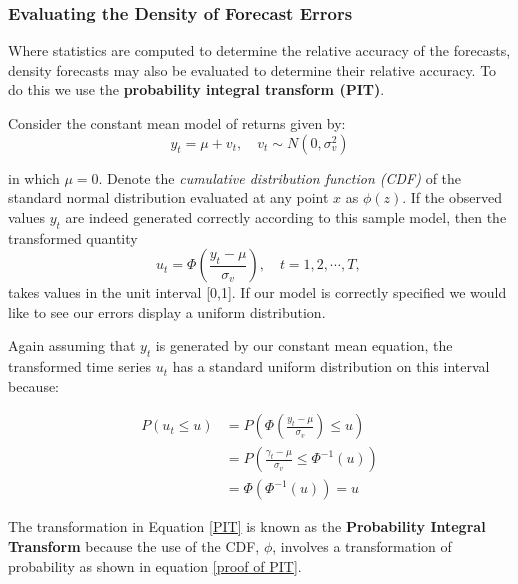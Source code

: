 \documentclass[11pt]{article}
\begin{document}
\subsubsection{Evaluating the Density of Forecast Errors}

Where statistics are computed to determine the relative accuracy of the forecasts, density forecasts may also be evaluated to determine their relative accuracy. To do this we use the \textbf{probability integral transform (PIT)}.

Consider the constant mean model of returns given by:
\begin{equation}
y_t=\mu+v_t, \quad v_t \sim N\left(0, \sigma_v^2\right)
\end{equation}

in which $\mu=0$. Denote the \textit{cumulative distribution function (CDF)} of the standard normal distribution evaluated at any point $x$ as $\phi(z)$. If the observed values $y_t$ are indeed generated correctly according to this sample model, then the transformed quantity
\begin{equation}
\label{PIT}
u_t=\Phi\left(\frac{y_t-\mu}{\sigma_v}\right), \quad t=1,2, \cdots, T \text {, }
\end{equation}
takes values in the unit interval [0,1]. If our model is correctly specified we would like to see our errors display a uniform distribution.

Again assuming that $y_t$ is generated by our constant mean equation, the transformed time series $u_t$ has a standard uniform distribution on this interval because:

\begin{equation}
\label{proof of PIT}
\begin{aligned}
P\left(u_t \leq u\right) & =P\left(\Phi\left(\frac{y_t-\mu}{\sigma_v}\right) \leqslant u\right) \\
& =P\left(\frac{\gamma_t-\mu}{\sigma_v} \leqslant \Phi^{-1}(u)\right) \\
& =\Phi\left(\Phi^{-1}(u)\right)=u
\end{aligned}
\end{equation}

The transformation in Equation \eqref{PIT} is known as the \textbf{Probability Integral Transform} because the use of the CDF, $\phi$, involves a transformation of probability as shown in equation \eqref{proof of PIT}.
\end{document}
